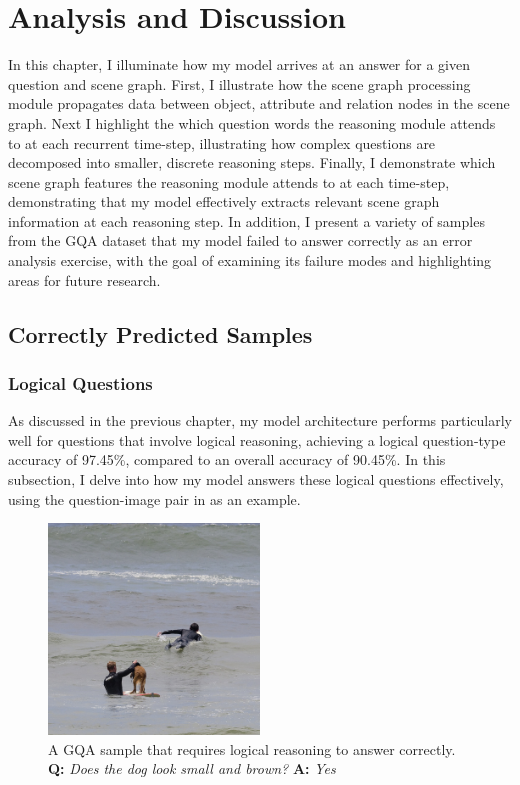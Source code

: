 \chapter{Analysis and Discussion}
\label{chapter:discussion}

In this chapter, I illuminate how my model arrives at an answer for a given question and scene graph. First, I illustrate how the scene graph processing module propagates data between object, attribute and relation nodes in the scene graph. Next I highlight the which question words the reasoning module attends to at each recurrent time-step, illustrating how complex questions are decomposed into smaller, discrete reasoning steps. Finally, I demonstrate which scene graph features the reasoning module attends to at each time-step, demonstrating that my model effectively extracts relevant scene graph information at each reasoning step. In addition, I present a variety of samples from the GQA dataset that my model failed to answer correctly as an error analysis exercise, with the goal of examining its failure modes and highlighting areas for future research.

\section{Correctly Predicted Samples}

\subsection{Logical Questions}
\label{subsection:discussion_logical_sample}

As discussed in the previous chapter, my model architecture performs particularly well for questions that involve logical reasoning, achieving a logical question-type accuracy of 97.45\%, compared to an overall accuracy of 90.45\%. In this subsection, I delve into how my model answers these logical questions effectively, using the question-image pair in \figureautorefname{ \ref{fig:positive_logical_sample}} as an example.

\begin{figure}[htbp]
    \centering
    \includegraphics[width=0.5\textwidth]{figures/positive_logical/positive_logical.png}
    \caption[A GQA sample that requires logical reasoning to answer correctly.]{A GQA sample that requires logical reasoning to answer correctly.\\\textbf{Q:} \textit{Does the dog look small and brown?} \textbf{A:} \textit{Yes}}
    \label{fig:positive_logical_sample}
\end{figure}

